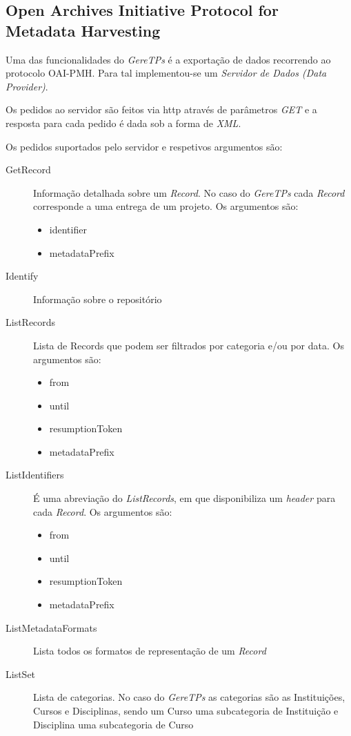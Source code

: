 \subsection{Open Archives Initiative Protocol for Metadata Harvesting} %
\label{sub:open_archives_initiative_protocol_for_metadata_harvesting}

Uma das funcionalidades do \emph{GereTPs} é a exportação de dados recorrendo ao protocolo OAI-PMH. Para tal implementou-se um \emph{Servidor de Dados (Data Provider)}.

Os pedidos ao servidor são feitos via http através de parâmetros \emph{GET} e a resposta para cada pedido é dada sob a forma de \emph{XML}.

Os pedidos suportados pelo servidor e respetivos argumentos são:

\begin{description}
	\item[GetRecord] Informação detalhada sobre um \emph{Record}. No caso do \emph{GereTPs} cada \emph{Record} corresponde a uma entrega de um projeto. Os argumentos são:
	\begin{itemize}
		\item identifier
		\item metadataPrefix
	\end{itemize}

	\item[Identify] Informação sobre o repositório

	\item[ListRecords] Lista de Records que podem ser filtrados por categoria e/ou por data. Os argumentos são:
	\begin{itemize}
	  	\item from
	  	\item until
	  	\item resumptionToken
	  	\item metadataPrefix
	\end{itemize}

	\item[ListIdentifiers] É uma abreviação do \emph{ListRecords}, em que disponibiliza um \emph{header} para cada \emph{Record}. Os argumentos são:
	\begin{itemize}
	  	\item from
	  	\item until
	  	\item resumptionToken
	  	\item metadataPrefix
	\end{itemize}

	\item[ListMetadataFormats] Lista todos os formatos de representação de um \emph{Record}

	\item[ListSet] Lista de categorias. No caso do \emph{GereTPs} as categorias são as Instituições, Cursos e Disciplinas, sendo um Curso uma subcategoria de Instituição e Disciplina uma subcategoria de Curso
\end{description}

